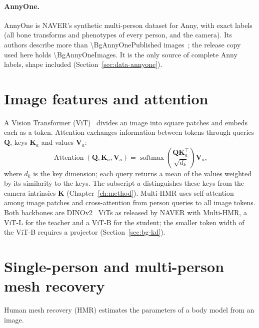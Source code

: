 
\paragraph{AnnyOne.}
AnnyOne is NAVER's synthetic multi-person dataset for Anny, with exact labels (all bone transforms and phenotypes of
every person, and the camera). Its authors describe more than \num{\BgAnnyOnePublished}
images~\cite{bravo2026annyfit}; the release copy used here holds \num{\BgAnnyOneImages}. It is the only source of
complete Anny labels, shape included (Section~\ref{sec:data-annyone}).

\section{Image features and attention}
\label{sec:bg-transformer}

A Vision Transformer (ViT)~\cite{dosovitskiy2021vit} divides an image into square patches and embeds each as a token.
Attention exchanges information between tokens through queries $\mathbf Q$, keys $\mathbf K_a$ and values
$\mathbf V_a$:
\begin{equation}
 \operatorname{Attention}(\mathbf Q,\mathbf K_a,\mathbf V_a)
 =\operatorname{softmax}\!\left(\frac{\mathbf Q\mathbf K_a^\top}{\sqrt{d_k}}\right)\mathbf V_a ,
 \label{eq:bg-attention}
\end{equation}
where $d_k$ is the key dimension; each query returns a mean of the values weighted by its similarity to the keys. The
subscript $a$ distinguishes these keys from the camera intrinsics $\mathbf K$ (Chapter~\ref{ch:method}). Multi-HMR uses
self-attention among image patches and cross-attention from person queries to all image tokens. Both backbones are
DINOv2~\cite{oquab2023dinov2} ViTs as released by NAVER with Multi-HMR, a ViT-L for the teacher and a ViT-B for the
student; the smaller token width of the ViT-B requires a projector (Section~\ref{sec:bg-kd}).

\section{Single-person and multi-person mesh recovery}
\label{sec:bg-hmr}

Human mesh recovery (HMR) estimates the parameters of a body model from an image.

